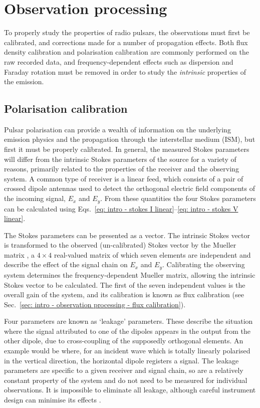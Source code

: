 \section{Observation processing}
\label{sec: intro - observation processing}

To properly study the properties of radio pulsars, the observations must first be calibrated, and corrections made for a number of propagation effects. Both flux density calibration and polarisation calibration are commonly performed on the raw recorded data, and frequency-dependent effects such as dispersion and Faraday rotation must be removed in order to study the \textit{intrinsic} properties of the emission.

\subsection{Polarisation calibration}
\label{sec: intro - observation processing - polarisation calibration}

Pulsar polarisation can provide a wealth of information on the underlying emission physics and the propagation through the interstellar medium (ISM), but first it must be properly calibrated. In general, the measured Stokes parameters will differ from the intrinsic Stokes parameters of the source for a variety of reasons, primarily related to the properties of the receiver and the observing system. A common type of receiver is a linear feed, which consists of a pair of crossed dipole antennas used to detect the orthogonal electric field components of the incoming signal, $E_x$ and $E_y$. From these quantities the four Stokes parameters can be calculated using Eqs.~\eqref{eq: intro - stokes I linear}--\eqref{eq: intro - stokes V linear}.

The Stokes parameters can be presented as a vector. The intrinsic Stokes vector is transformed to the observed (un-calibrated) Stokes vector by the Mueller matrix \citep{Mxxx1948}, a $4\times4$ real-valued matrix of which seven elements are independent and describe the effect of the signal chain on $E_x$ and $E_y$. Calibrating the observing system determines the frequency-dependent Mueller matrix, allowing the intrinsic Stokes vector to be calculated. The first of the seven independent values is the overall gain of the system, and its calibration is known as flux calibration (see Sec.~\ref{sec: intro - observation processing - flux calibration}).

Four parameters are known as `leakage' parameters. These describe the situation where the signal attributed to one of the dipoles appears in the output from the other dipole, due to cross-coupling of the supposedly orthogonal elements. An example would be where, for an incident wave which is totally linearly polarised in the vertical direction, the horizontal dipole registers a signal. The leakage parameters are specific to a given receiver and signal chain, so are a relatively constant property of the system and do not need to be measured for individual observations. It is impossible to eliminate all leakage, although careful instrument design can minimise its effects \citep[e.g.][]{RTxx2018}. 

